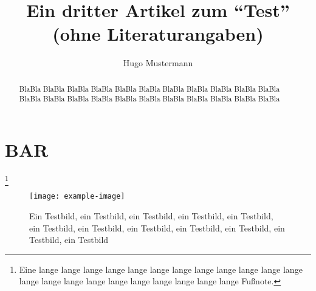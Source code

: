 \documentclass{dtk2}
\author{Hugo Mustermann}
\begin{document}
\title{Ein dritter Artikel zum "`Test"' (ohne Literaturangaben)}

\maketitle

\begin{abstract}
BlaBla BlaBla BlaBla BlaBla BlaBla BlaBla BlaBla BlaBla BlaBla BlaBla BlaBla
BlaBla BlaBla BlaBla BlaBla BlaBla BlaBla BlaBla BlaBla BlaBla BlaBla BlaBla
\end{abstract}

\section{BAR}

\blindtext\footnote{Eine lange lange lange lange lange lange lange lange lange
lange lange lange lange lange lange lange lange lange lange lange lange lange
Fußnote.}%

\begin{figure}[p] \centering
  \texttt{[image: example-image]}
  \caption{Ein Testbild, ein Testbild, ein Testbild, ein Testbild, ein
  Testbild, ein Testbild, ein Testbild, ein Testbild, ein Testbild, ein
  Testbild, ein Testbild, ein Testbild}
\end{figure}
\end{document}
